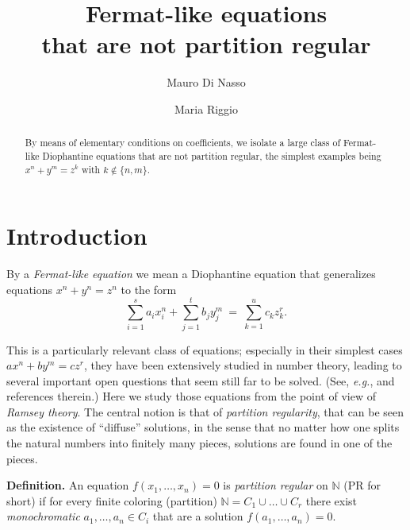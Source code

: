 \documentclass[11pt]{amsart}
\theoremstyle{definition}
\theoremstyle{remark}
\numberwithin{equation}{section}
\begin{document}
\title[Fermat-like equations that are not partition regular]
{Fermat-like equations
\\
that are not partition regular}

\author{Mauro Di Nasso}
\address{Dipartimento di Matematica,
Universit\`{a} di Pisa, Italy.} 

\author{Maria Riggio}
\address{Dipartimento di Matematica,
Universit\`{a} di Pisa, Italy.} 



\maketitle

\begin{abstract}
By means of elementary conditions on coefficients,
we isolate a large class of Fermat-like Diophantine
equations that are not partition regular, the simplest
examples being $x^n+y^m=z^k$ with $k\notin\{n,m\}$.
\end{abstract}

\bigskip
\section{Introduction}

By a \emph{Fermat-like equation} we mean a Diophantine
equation that generalizes equations $x^n+y^n=z^n$
to the form 
$$\sum_{i=1}^s a_i x_i^n+\sum_{j=1}^t b_j y_j^m\ =\ 
\sum_{k=1}^u c_k z_k^r.$$

This is a particularly relevant class of 
equations; especially in their simplest cases $ax^n+by^m=c z^r$,
they have been extensively studied in number theory,
leading to several important open questions that seem still far to be solved.
(See, \emph{e.g.}, \cite{BCDY15} and references therein.)
Here we study those equations from the point of view
of \emph{Ramsey theory}. The central notion is that of
\emph{partition regularity}, that can be seen
as the existence of ``diffuse'' solutions, in the sense
that no matter how one splits the natural numbers into
finitely many pieces, solutions are found in one of the pieces.

\smallskip
\noindent
\textbf{Definition.}
An equation $f(x_1,\ldots,x_n)=0$ is
\emph{partition regular} on ${\mathbb{N}}$ (PR for short)
if for every finite coloring (partition) ${\mathbb{N}}=C_1\cup\ldots\cup C_r$
there exist \emph{monochromatic} $a_1,\ldots,a_n\in C_i$
that are a solution $f(a_1,\ldots,a_n)=0$.
\end{document}
